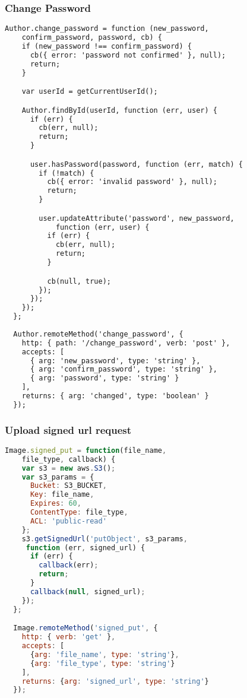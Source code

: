 \subsubsection{Change Password}

\begin{lstlisting}[language=html]
Author.change_password = function (new_password, 
	confirm_password, password, cb) {
    if (new_password !== confirm_password) {
      cb({ error: 'password not confirmed' }, null);
      return;
    }

    var userId = getCurrentUserId();  

    Author.findById(userId, function (err, user) {
      if (err) {
        cb(err, null);
        return;
      }

      user.hasPassword(password, function (err, match) {
        if (!match) {
          cb({ error: 'invalid password' }, null);
          return;
        }

        user.updateAttribute('password', new_password, 
        	function (err, user) {
          if (err) {
            cb(err, null);
            return;
          }

          cb(null, true);
        });
	  });       
    });
  };
   
  Author.remoteMethod('change_password', {
    http: { path: '/change_password', verb: 'post' },
    accepts: [
      { arg: 'new_password', type: 'string' },
      { arg: 'confirm_password', type: 'string' },
      { arg: 'password', type: 'string' }
    ],
    returns: { arg: 'changed', type: 'boolean' }
  });
\end{lstlisting}

\subsubsection{Upload signed url request}

\begin{lstlisting}[language=javascript]
Image.signed_put = function(file_name, 
	file_type, callback) {
    var s3 = new aws.S3();
    var s3_params = {
      Bucket: S3_BUCKET,
      Key: file_name,
      Expires: 60,
      ContentType: file_type,
      ACL: 'public-read'
    };
    s3.getSignedUrl('putObject', s3_params,
     function (err, signed_url) {
      if (err) {
        callback(err);
        return;
      }
      callback(null, signed_url);
    });
  };

  Image.remoteMethod('signed_put', {
    http: { verb: 'get' },
    accepts: [
      {arg: 'file_name', type: 'string'},
      {arg: 'file_type', type: 'string'}
    ],
    returns: {arg: 'signed_url', type: 'string'}
  });
\end{lstlisting}


